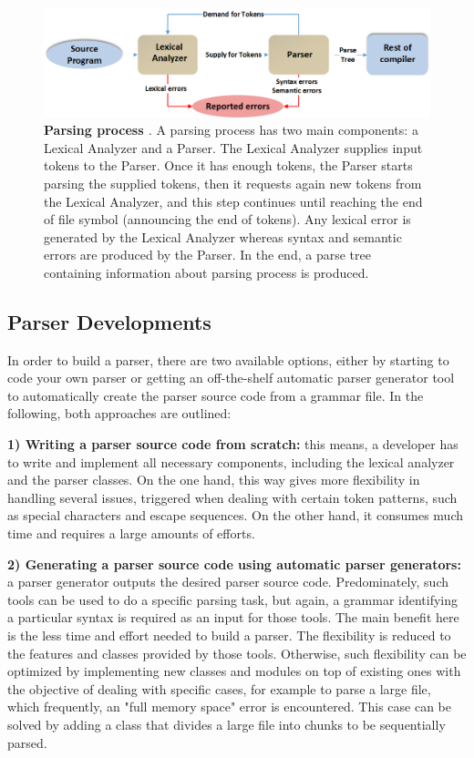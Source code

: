\begin{figure}[ht]
	\begin{center}	\setlength\belowcaptionskip{-5mm}
	\includegraphics[scale=0.55,angle=0]{images/ParserRole}
	\caption{\textbf{Parsing process \citep{JCOMP:Tool:Online}}. 
	A parsing process has two main components: a Lexical Analyzer and a Parser. 
	The Lexical Analyzer supplies input tokens to the Parser.
	Once it has enough tokens, the Parser starts parsing the supplied tokens, then it requests again new tokens from the Lexical Analyzer, and this step continues until reaching the end of file symbol (announcing the end of tokens).	Any lexical error is generated by the Lexical Analyzer whereas syntax and semantic errors are produced by the Parser.
	In the end, a parse tree containing information about parsing process is produced.}
		\label{Fig:parserPosition}
	\end{center}
\end{figure}

\subsection{Parser Developments}
In order to build a parser, there are two available options, either by starting to code your own parser or getting an off-the-shelf automatic parser generator tool to automatically create the parser source code from a grammar file. 
In the following, both approaches are outlined:

\textbf{1) Writing a parser source code from scratch:} this means, a developer has to write and implement all necessary components, including the lexical analyzer and the parser classes. 
On the one hand, this way gives more flexibility in handling several issues, triggered when dealing with certain token patterns, such as special characters and escape sequences. 
On the other hand, it consumes much time and requires a large amounts of efforts.

\textbf{2) Generating a parser source code using automatic parser generators:} a parser generator outputs the desired parser source code. 
Predominately, such tools can be used to do a specific parsing task, but again, a grammar identifying a particular syntax is required as an input for those tools. 
The main benefit here is the less time and effort needed to build a parser.
The flexibility is reduced to the features and classes provided by those tools.
Otherwise, such flexibility can be optimized by implementing new classes and modules on top of existing ones with the objective of dealing with specific cases, for example to parse a large file, which frequently, an "full memory space" error is encountered.
This case can be solved by adding a class that divides a large file into chunks to be sequentially parsed.  

